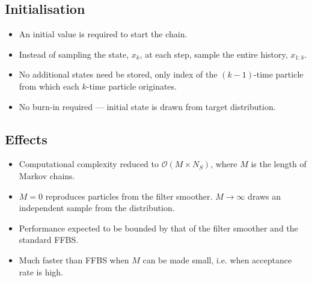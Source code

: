 \documentclass[landscape]{sciposter}
\begin{document}
\begin{multicols}{4}
\columnbreak

\subsection*{Initialisation}
%
\begin{itemize}
  \item An initial value is required to start the chain.
  \item Instead of sampling the state, $x_k$, at each step, sample the entire history, $x_{1:k}$.
  \item No additional states need be stored, only index of the $(k-1)$-time particle from which each $k$-time particle originates.
  \item No burn-in required --- initial state is drawn from target distribution.
\end{itemize}



\subsection*{Effects}
%
\begin{itemize}
  \item Computational complexity reduced to $\mathcal{O}(M \times N_S)$, where $M$ is the  length of Markov chains.
  \item $M = 0$ reproduces particles from the filter smoother. $M \rightarrow \infty$ draws an independent sample from the distribution.
  \item Performance expected to be bounded by that of the filter smoother and the standard FFBS.
  \item Much faster than FFBS when $M$ can be made small, i.e. when acceptance rate is high.
\end{itemize}





\end{multicols}
\end{document}
